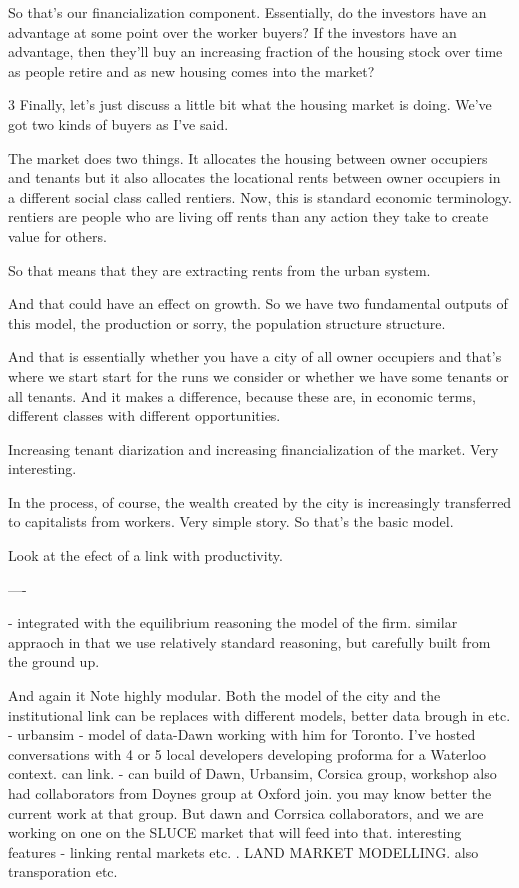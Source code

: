 \documentclass[]{article}
\begin{document}
So that's our financialization component. Essentially,  do the investors have an advantage at some point over the worker buyers? If the investors have an advantage, then they'll buy an increasing fraction of the housing stock over time as people retire and as new housing comes into the market?



3 Finally, let's just discuss a little bit what the housing market is doing. We've got two kinds of buyers as I've said.

The market does two things. It allocates the housing between owner occupiers and tenants but it also allocates the locational rents between owner occupiers in a different social class called rentiers. Now, this is standard economic terminology. rentiers are people who are living off  rents than any action they take to create value for others.

So that means that they are extracting rents from the urban system.

And that could have an effect on growth. So we have two fundamental outputs of this model, the production or sorry, the population structure structure.

And that is essentially whether you have a city of all owner occupiers and that's where we start start for the runs we consider or whether we have some tenants or all tenants. And it makes a difference, because these are, in economic terms, different classes with different opportunities.

Increasing tenant diarization and increasing financialization of the market. Very interesting.

In the process, of course, the wealth created by the city is increasingly transferred to capitalists from workers. Very simple story.
So that's the basic model.

Look at the efect of a link with productivity.

----

- integrated with the equilibrium reasoning the model of the firm.
 similar appraoch in that we use relatively standard reasoning, but carefully built from the ground up. 

And again it Note highly modular. Both the model of the city and the institutional link can be replaces with different models, better data brough in etc. - urbansim - model of data-Dawn working with him for Toronto. I've hosted conversations with 4 or 5 local developers developing proforma for a Waterloo context.  can link. 
- can build of Dawn, Urbansim, Corsica group, workshop also had collaborators from Doynes group at Oxford join. you may know better the current work at that group. But dawn and Corrsica collaborators, and we are working on one on the SLUCE market that will feed into that. interesting features - linking rental markets etc. .
LAND MARKET MODELLING.
also transporation etc.
\end{document}
